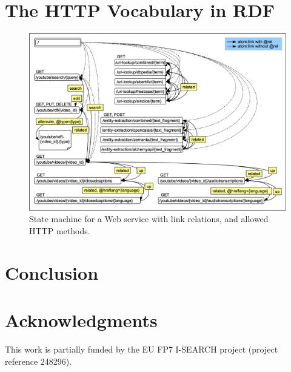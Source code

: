 \documentclass{acm_proc_article-sp}
\begin{document}
\section{The HTTP Vocabulary in RDF}\label{sec:httpvocab}

\begin{figure}
 \centering
 \includegraphics[width=\linewidth]{statemachine.png}
 \caption{State machine for a Web service with link relations, and allowed HTTP methods.}
 \label{fig:statemachine}
\end{figure}

\section{Conclusion}\label{sec:conclusion}


\section{Acknowledgments}\label{sec:acknowledgments}
This work is partially funded by the EU FP7 I-SEARCH project (project reference 248296).

%

%
%

\end{document}
